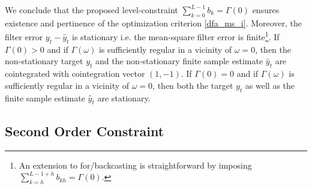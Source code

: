 \documentclass[a4paper]{book}
\begin{document}
We conclude that the proposed level-constraint $\sum_{k=0}^{L-1}b_{k}=\Gamma(0)$ ensures existence and pertinence of the optimization criterion \ref{dfa_ms_i}. Moreover, the filter error $y_t-\hat{y}_t$ is stationary i.e. the mean-square filter error is finite\footnote{An extension to for/backcasting is straightforward by imposing $\sum_{k=h}^{L-1+h}b_{kh}=\Gamma(0)$.}. If $\Gamma(0)>0$ and if $\Gamma(\omega)$ is sufficiently regular in a vicinity of $\omega=0$, then the non-stationary target $y_t$ and the non-stationary finite sample estimate $\hat{y}_t$ are cointegrated with cointegration vector $(1,-1)$. If $\Gamma(0)=0$ and if $\Gamma(\omega)$ is sufficiently regular in a vicinity of $\omega=0$, then both the target $y_t$ as well as the finite sample estimate $\hat{y}_t$ are stationary. 




\subsection{Second Order Constraint}\label{socco}
\end{document}
